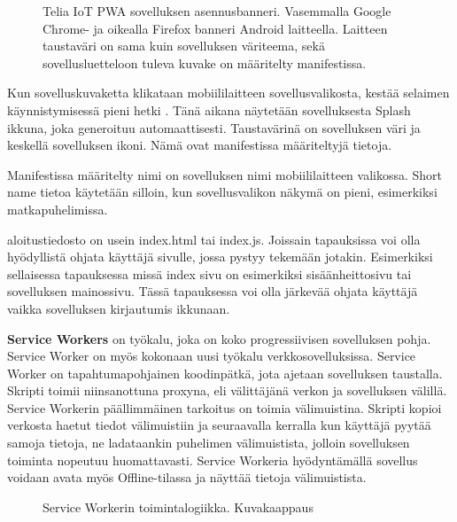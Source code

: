 \documentclass{tktltiki}
\begin{document}
\begin{figure}[!ht]
\begin{center}
\caption{Telia IoT PWA sovelluksen asennusbanneri. Vasemmalla Google Chrome- ja oikealla Firefox banneri Android laitteella. Laitteen taustaväri on sama kuin sovelluksen väriteema, sekä sovellusluetteloon tuleva kuvake on määritelty manifestissa.}
\label{asennusbanneri}
\end{center}
\end{figure}

Kun sovelluskuvaketta klikataan mobiililaitteen sovellusvalikosta, kestää selaimen käynnistymisessä pieni hetki \cite{hiltunen2018creating}. Tänä aikana näytetään sovelluksesta Splash ikkuna, joka generoituu automaattisesti. Taustavärinä on sovelluksen väri ja keskellä sovelluksen ikoni. Nämä ovat manifestissa määriteltyjä tietoja.

Manifestissa määritelty nimi on sovelluksen nimi mobiililaitteen valikossa. Short name tietoa käytetään silloin, kun sovellusvalikon näkymä on pieni, esimerkiksi matkapuhelimissa.

aloitustiedosto on usein index.html tai index.js. Joissain tapauksissa voi olla hyödyllistä ohjata käyttäjä sivulle, jossa pystyy tekemään jotakin. Esimerkiksi sellaisessa tapauksessa missä index sivu on esimerkiksi sisäänheittosivu tai sovelluksen mainossivu. Tässä tapauksessa voi olla järkevää ohjata käyttäjä vaikka sovelluksen kirjautumis ikkunaan.

\clearpage

\textbf{Service Workers} on työkalu, joka on koko progressiivisen sovelluksen pohja. Service Worker on myös kokonaan uusi työkalu verkkosovelluksissa. Service Worker on tapahtumapohjainen koodinpätkä, jota ajetaan sovelluksen taustalla. Skripti toimii niinsanottuna proxyna, eli välittäjänä verkon ja sovelluksen välillä. Service Workerin päällimmäinen tarkoitus on toimia välimuistina. Skripti kopioi verkosta haetut tiedot välimuistiin ja seuraavalla kerralla kun käyttäjä pyytää samoja tietoja, ne ladataankin puhelimen välimuistista, jolloin sovelluksen toiminta nopeutuu huomattavasti. Service Workeria hyödyntämällä sovellus voidaan avata myös Offline-tilassa ja näyttää tietoja välimuistista. 

\begin{figure}[h]
\begin{center}
\caption{Service Workerin toimintalogiikka. Kuvakaappaus \cite{GoogleDevSummit} }
\label{Service workerin toiminta}
\end{center}
\end{figure}
\clearpage
\end{document}
